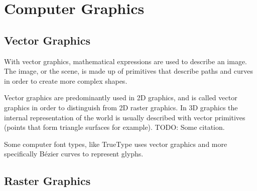 \section{Computer Graphics}

\subsection{Vector Graphics}
With vector graphics, mathematical expressions are used to describe an image.
The image, or the scene, is made up of primitives that describe paths and curves in order to create more complex shapes.

Vector graphics are predominantly used in 2D graphics, and is called vector graphics in order to distinguish from 2D raster graphics.
In 3D graphics the internal representation of the world is usually described with vector primitives (points that form triangle surfaces for example).
TODO: Some citation.

Some computer font types, like TrueType uses vector graphics and more specifically Bézier curves to represent glyphs\cite{truetype}.

\subsection{Raster Graphics}
